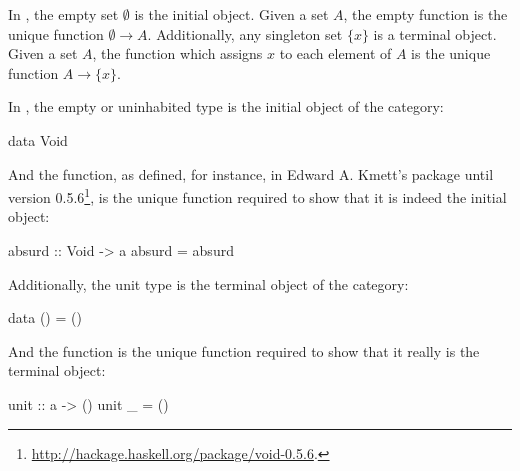 \begin{example}


  \label{ex:initial-terminal-objects-set}

  In \set, the empty set $\emptyset$ is the initial object. Given a
  set $A$, the empty function is the unique function $\emptyset \to
  A$. Additionally, any singleton set $\{x\}$ is a terminal object.
  Given a set $A$, the function which assigns $x$ to each element of
  $A$ is the unique function $A \to \{x\}$.

\end{example}

\begin{example}

  \label{ex:initial-terminal-objects-haskell}

  In \hask, the empty or uninhabited type is the initial object of the
  category:
  \begin{codehaskell}
data Void
  \end{codehaskell}
  And the  function, as defined, for instance, in
  Edward A. Kmett's  package until version
  0.5.6\footnote{\url{http://hackage.haskell.org/package/void-0.5.6}.},
  is the unique function required to show that it is indeed the
  initial object:
  \begin{codehaskell}
absurd :: Void -> a
absurd = absurd
  \end{codehaskell}
  Additionally, the unit type is the terminal object of the category:
  \begin{codehaskell}
data () = ()
  \end{codehaskell}
  And the  function is the unique function required
  to show that it really is the terminal object:
  \begin{codehaskell}
unit :: a -> ()
unit _ = ()
  \end{codehaskell}

\end{example}


